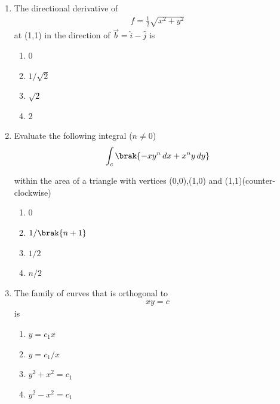 \documentclass[journal,12pt,onecolumn]{IEEEtran}
\theoremstyle{remark}
\begin{document}
\begin{enumerate}
\begin{multicols}{4}
    \begin{enumerate}
        \item $0$
        \item $2+ce^{-\frac{x^2}{2}}$
        \item $c_1x + c_2x^2$
        \item $2x+cxe^{-\frac{x^2}{2}}$
    \end{enumerate}
\end{multicols}

    \item The directional derivative of 
    \begin{align*}
        f=\frac{1}{2}\sqrt{x^2+y^2}
    \end{align*}
    at (1,1) in the direction of $\vec{b}=\hat{i} - \hat{j} $ is 

    \begin{multicols}{4}
    \begin{enumerate}
        \item 0
        \item $1/\sqrt{2}$
        \item $\sqrt{2}$
        \item $2$
    \end{enumerate}
    \end{multicols}

    \item Evaluate the following integral ($n\neq 0$)
    \begin{align*}
        \int_{c}\brak{-xy^n\,dx+x^ny\,dy}
    \end{align*}

within the area of a triangle with vertices (0,0),(1,0) and (1,1)(counter- clockwise)

\begin{multicols}{4}
    \begin{enumerate}
        \item 0
        \item $1/\brak{n+1}$
        \item $1/2$
        \item $n/2$
    \end{enumerate}
\end{multicols}

    \item The family of curves that is orthogonal to 
    \begin{align*}
        xy=c
    \end{align*}
    is
\begin{multicols}{4}
    \begin{enumerate}
        \item $y=c_1x$
        \item $y=c_1/x$
        \item $y^2+x^2=c_1$
        \item $y^2-x^2=c_1$
    \end{enumerate}
\end{multicols}


\end{enumerate}
\end{document}
